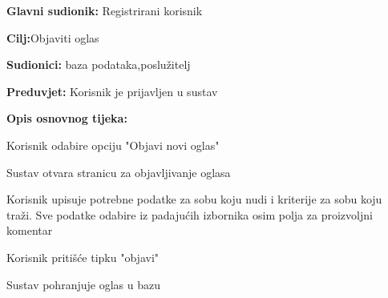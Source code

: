 \noindent {}
\begin{packed_item}
	
	\item \textbf{Glavni sudionik: }Registrirani korisnik
	\item  \textbf{Cilj:}Objaviti oglas
	\item  \textbf{Sudionici:} baza podataka,poslužitelj
	\item  \textbf{Preduvjet:} Korisnik je prijavljen u sustav
	\item  \textbf{Opis osnovnog tijeka:}
	
	\item[] \begin{packed_enum}
		
		\item Korisnik odabire opciju "Objavi novi oglas"
		\item Sustav otvara stranicu za objavljivanje oglasa
		\item Korisnik upisuje potrebne podatke za sobu koju nudi i kriterije za sobu koju traži. Sve podatke odabire iz padajućih izbornika osim polja za proizvoljni komentar
		\item Korisnik pritišće tipku "objavi" 
		\item Sustav pohranjuje oglas u bazu
	\end{packed_enum}
	
\end{packed_item}

